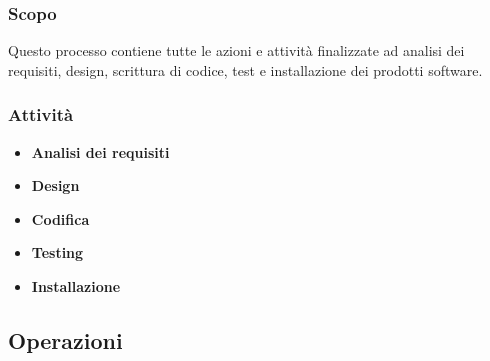 \subsubsection{Scopo} Questo processo contiene tutte le azioni e attività finalizzate ad analisi dei requisiti, design, scrittura di codice, test e installazione dei prodotti software.
\subsubsection{Attività}
\begin{itemize}
    \item \textbf{Analisi dei requisiti}
    \item \textbf{Design}
    \item \textbf{Codifica}
    \item \textbf{Testing}
    \item \textbf{Installazione}
\end{itemize}
\subsection{Operazioni}


